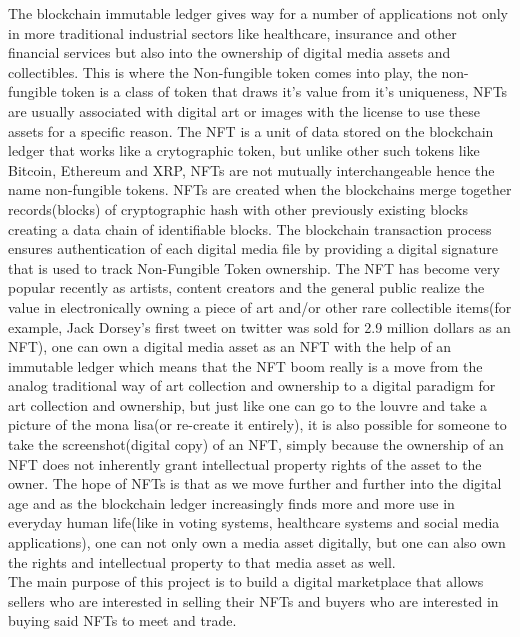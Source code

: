 \documentclass[a4paper,12pt]{article}
\begin{document}
The blockchain immutable ledger gives way for a number of applications not only in more traditional industrial sectors like healthcare, insurance and other financial services but also into the ownership of digital media assets and collectibles. This is where the Non-fungible token comes into play, the non-fungible token is a class of token that draws it's value from it's uniqueness, NFTs are usually associated with digital art or images with the license to use these assets for a specific reason. The NFT is a unit of data stored on the blockchain ledger that works like a crytographic token, but unlike other such tokens like Bitcoin, Ethereum and XRP, NFTs are not mutually interchangeable hence the name non-fungible tokens. NFTs are created when the blockchains merge together records(blocks) of cryptographic hash with other previously existing blocks creating a data chain of identifiable blocks. The blockchain transaction process ensures authentication of each digital media file by providing a digital signature that is used to track Non-Fungible Token ownership. The NFT has become very popular recently as artists, content creators and the general public realize the value in electronically owning a piece of art and/or other rare collectible items(for example, Jack Dorsey’s first tweet on twitter was sold for 2.9  million dollars as an NFT), one can own a digital media asset as an NFT with the help of an immutable ledger which means that the NFT boom really is a move from the analog traditional way of art collection and ownership to a digital paradigm for art collection and ownership, but just like one can go to the louvre and take a picture of the mona lisa(or re-create it entirely), it is also possible for someone to take the screenshot(digital copy) of an NFT, simply because the ownership of an NFT does not inherently grant intellectual property rights of the asset to the owner. The hope of NFTs is that as we move further and further into the digital age and as the blockchain ledger increasingly finds more and more use in everyday human life(like in voting systems, healthcare systems and social media applications), one can not only own a media asset digitally,  but one can also own the rights and intellectual property to that media asset as well. \\

The main purpose of this project is to build a digital marketplace that allows sellers who are interested in selling their NFTs and buyers who are interested in buying said NFTs to meet and trade. 
\end{document}
